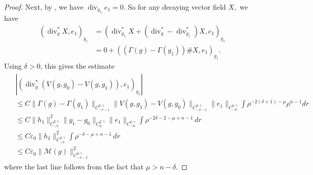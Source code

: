 \documentclass[12pt]{amsart}
\newcommand{\calM}{\mathcal{M}}
\renewcommand{\1}{{\mathbf 1}}
\renewcommand{\div}{{\operatorname{div} }}
\newcommand{\eps}{{\varepsilon}}
\theoremstyle{others}
\numberwithin{equation}{section}
\begin{document}
\begin{proof}
Next, by \cite[Lemma 2.5]{DeruelleKroncke20}, we have $\div_{g_1} e_1 = 0.$ So for any decaying vector field $X,$ we have
\begin{equation*}
\begin{split}
 \left( \div_g^* X, e_1 \right)_{g_1} & = \left( \div_{g_1}^* X + \left( \div^*_g - \div_{g_1}^* \right) X , e_1 \right)_{g_1} \\
 & = 0 + \left( \left( \Gamma(g) - \Gamma(g_1) \right) \# X , e_1 \right)_{g_1}.
    \end{split}
\end{equation*}
Using $\delta > 0$, this gives the estimate
\begin{gather} \label{divg*v1est} \begin{aligned}
    &\left| \left( \div_g^* \left( V(g,g_0) - V(g,g_1) \right), e_1 \right)_{g_1} \right| \\
    &\leq C \| \Gamma(g) - \Gamma(g_1) \|_{C^{0, \gamma}_{-\delta-1}} \| V(g, g_1) - V(g, g_0) \|_{C^{0, \gamma}_{-\delta-1} } \| e_1 \|_{C^{0, \gamma}_{-\mu}} 
    \int \rho^{-2(\delta+1) - \mu} \rho^{n-1}  dr \\
    & \leq C \|h_1 \|_{C^{2, \gamma}_{- \delta }}^2 \| g_1 - g_0 \|_{C^{2, \gamma}_{0}} \| e_1 \|_{C^{0, \gamma}_{-\mu}}  \int \rho^{-2\delta - 2 - \mu + n-1}  \, dr \\
    & \leq C \eps_0 \|h_1 \|_{C^{2, \gamma}_{- \delta }}^2
    \int \rho^{-\delta - \mu + n-1}  \, dr \\ 
    & \leq C \eps_0\|\calM(g)\|^2_{C^{0, \gamma}_{-\delta - 2}}
\end{aligned} \end{gather}
where the last line follows from the fact that $\mu > n - \delta$.

\end{proof}
\end{document}
